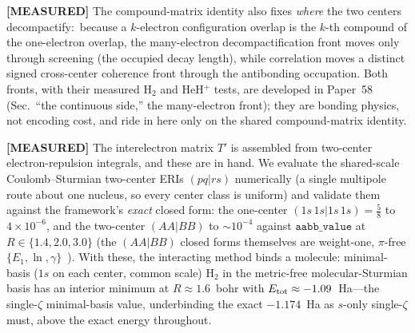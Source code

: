 \documentclass[aps,pra,twocolumn,superscriptaddress,longbibliography]{revtex4-2}
\begin{document}
\textbf{[MEASURED]} The compound-matrix identity also fixes \emph{where} the
two centers decompactify:\ because a $k$-electron configuration overlap is the
$k$-th compound of the one-electron overlap, the many-electron
decompactification front moves only through screening (the occupied decay
length), while correlation moves a distinct signed cross-center coherence
front through the antibonding occupation.  Both fronts, with their measured
H$_2$ and HeH$^+$ tests, are developed in Paper~58~\cite{loutey_paper58}
(Sec.~``the continuous side,'' the many-electron front); they are bonding
physics, not encoding cost, and ride in here only on the shared
compound-matrix identity.

\textbf{[MEASURED]} The interelectron matrix $T'$ is assembled from two-center electron-repulsion
integrals, and these are in hand.  We evaluate the shared-scale Coulomb--Sturmian two-center ERIs
$(pq|rs)$ numerically (a single multipole route about one nucleus, so every center class is uniform)
and validate them against the framework's \emph{exact} closed form: the one-center
$(1s\,1s|1s\,1s)=\tfrac58$ to $4\times10^{-6}$, and the two-center $(AA|BB)$ to $\sim\!10^{-4}$
against $\texttt{aabb\_value}$ at $R\in\{1.4,2.0,3.0\}$ (the $(AA|BB)$ closed forms themselves are weight-one,
$\pi$-free $\{E_1,\ln,\gamma\}$~\cite{loutey_paper58,loutey_paper59}).  With these, the interacting
method binds a molecule: minimal-basis ($1s$ on each center, common scale) $\mathrm{H}_2$ in the
metric-free molecular-Sturmian basis has an interior minimum at $R\approx1.6$~bohr with
$E_{\rm tot}\approx-1.09$~Ha---the single-$\zeta$ minimal-basis value, underbinding the exact $-1.174$~Ha as
$s$-only single-$\zeta$ must, above the exact energy throughout.
\end{document}
